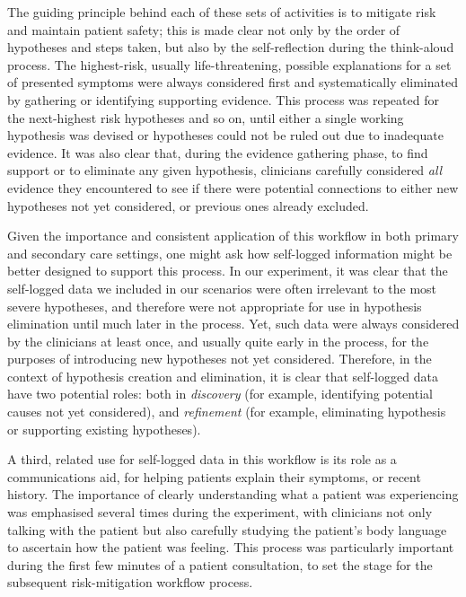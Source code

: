 \documentclass{sigchi}
\begin{document}
The guiding principle behind each of these sets of activities is to mitigate risk and maintain patient safety;  this is made clear not only by the order of hypotheses and steps taken, but also by the self-reflection during the think-aloud process. The highest-risk, usually life-threatening, possible explanations for a set of presented symptoms were always considered first and systematically eliminated by gathering or identifying supporting evidence.  This process was repeated for the next-highest risk hypotheses and so on, until either a single working hypothesis was devised or hypotheses could not be ruled out due to inadequate evidence. It was also clear that, during the evidence gathering phase, to find support or to eliminate any given hypothesis, clinicians carefully considered \emph{all} evidence they encountered to see if there were potential connections to either new hypotheses not yet considered, or previous ones already excluded.

Given the importance and consistent application of this workflow in both primary and secondary care settings, one might ask how self-logged information might be better designed to support this process. In our experiment, it was clear that the self-logged data we included in our scenarios were often irrelevant to the most severe hypotheses, and therefore were not appropriate for use in hypothesis elimination until much later in the process.  Yet, such data were always considered by the clinicians at least once, and usually quite early in the process, for the purposes of introducing new hypotheses not yet considered.  Therefore, in the context of hypothesis creation and elimination, it is clear that self-logged data have two potential roles: both in \emph{discovery} (for example, identifying potential causes not yet considered), and \emph{refinement} (for example, eliminating hypothesis or supporting existing hypotheses).

A third, related use for self-logged data in this workflow is its role as a communications aid, for helping patients explain their symptoms, or recent history.  The importance of clearly understanding what a patient was experiencing was emphasised several times during the experiment, with clinicians not only talking with the patient but also carefully studying the patient's body language to ascertain how the patient was feeling.  This process was particularly important during the first few minutes of a patient consultation, to set the stage for the subsequent risk-mitigation workflow process.
\end{document}
